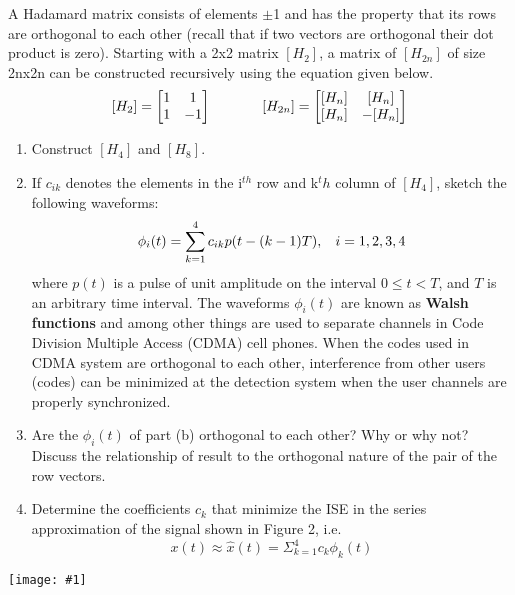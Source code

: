 \documentclass[12pt,letterpaper]{hmcpset}
\newcommand{\diagram}[2]{\begin{center}\texttt{[image: \#1]}\end{center}}
\begin{document}
\begin{problem}[2] 
	A Hadamard matrix consists of elements $\pm$1 and has the property that its rows are
	orthogonal to each other (recall that if two vectors are orthogonal their dot product is zero).
	Starting with a 2x2 matrix $[H_2]$, a matrix of $[H_{2n}]$ of size 2nx2n can be constructed
	recursively using the equation given below.
	$$ [H_2]=\begin{bmatrix} 1 & 1 \\ 1 & -1 \end{bmatrix}
	   \hspace{0.5in}
	   [H_{2n}]=\begin{bmatrix} [H_n] & [H_n] \\ [H_n] & -[H_n] \end{bmatrix} $$
	\begin{enumerate}
		\item Construct $[H_4]$ and $[H_8]$.
		
		\item If $c_{ik}$ denotes the elements in the i$^{th}$ row and k$^th$ column of $[H_4]$, sketch the following
		waveforms:
		$$ \phi_i (t) = \sum_{k=1}^4 c_{ik}p(t-(k-1)T),\hspace{2ex} i = 1,2,3,4$$
		where $p(t)$ is a pulse of unit amplitude on the interval $0 \leq t < T$, and $T$ is an arbitrary time
		interval. The waveforms $\phi_i (t)$ are known as \textbf{Walsh functions} and among other things are used to
		separate channels in Code Division Multiple Access (CDMA) cell phones. When the codes used
		in CDMA system are orthogonal to each other, interference from other users (codes) can be
		minimized at the detection system when the user channels are properly synchronized.
		
		\item Are the $\phi_i (t)$ of part (b) orthogonal to each other? Why or why not? Discuss the
		relationship of result to the orthogonal nature of the pair of the row vectors.
		
		\item Determine the coefficients $c_k$ that minimize the ISE in the series approximation of the
		signal shown in Figure 2, i.e.
		$$ x(t) \approx \widehat{x}(t) = \Sigma_{k=1}^4 c_k \phi_k (t) $$
	\end{enumerate}
	\diagram{Figure_2}{2.5}
\end{problem}

\begin{solution}
	\vfill
\end{solution}
\end{document}
